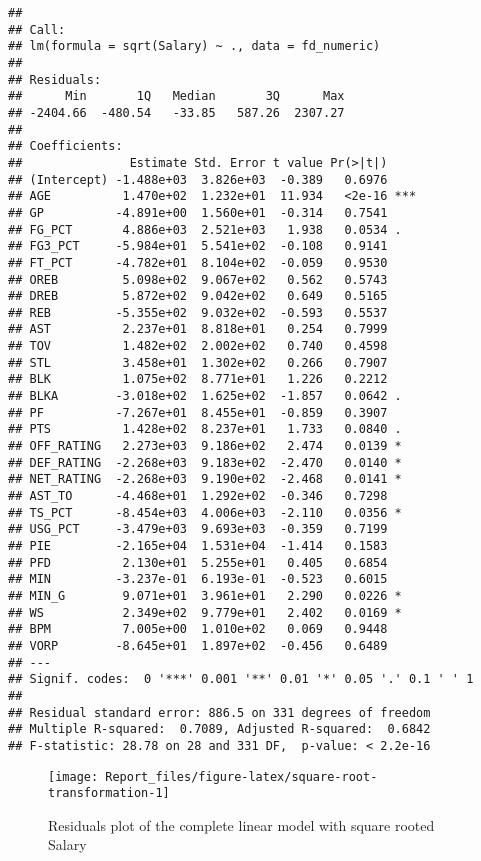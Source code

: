 \documentclass[
]{article}
\begin{document}
\begin{verbatim}
## 
## Call:
## lm(formula = sqrt(Salary) ~ ., data = fd_numeric)
## 
## Residuals:
##      Min       1Q   Median       3Q      Max 
## -2404.66  -480.54   -33.85   587.26  2307.27 
## 
## Coefficients:
##               Estimate Std. Error t value Pr(>|t|)    
## (Intercept) -1.488e+03  3.826e+03  -0.389   0.6976    
## AGE          1.470e+02  1.232e+01  11.934   <2e-16 ***
## GP          -4.891e+00  1.560e+01  -0.314   0.7541    
## FG_PCT       4.886e+03  2.521e+03   1.938   0.0534 .  
## FG3_PCT     -5.984e+01  5.541e+02  -0.108   0.9141    
## FT_PCT      -4.782e+01  8.104e+02  -0.059   0.9530    
## OREB         5.098e+02  9.067e+02   0.562   0.5743    
## DREB         5.872e+02  9.042e+02   0.649   0.5165    
## REB         -5.355e+02  9.032e+02  -0.593   0.5537    
## AST          2.237e+01  8.818e+01   0.254   0.7999    
## TOV          1.482e+02  2.002e+02   0.740   0.4598    
## STL          3.458e+01  1.302e+02   0.266   0.7907    
## BLK          1.075e+02  8.771e+01   1.226   0.2212    
## BLKA        -3.018e+02  1.625e+02  -1.857   0.0642 .  
## PF          -7.267e+01  8.455e+01  -0.859   0.3907    
## PTS          1.428e+02  8.237e+01   1.733   0.0840 .  
## OFF_RATING   2.273e+03  9.186e+02   2.474   0.0139 *  
## DEF_RATING  -2.268e+03  9.183e+02  -2.470   0.0140 *  
## NET_RATING  -2.268e+03  9.190e+02  -2.468   0.0141 *  
## AST_TO      -4.468e+01  1.292e+02  -0.346   0.7298    
## TS_PCT      -8.454e+03  4.006e+03  -2.110   0.0356 *  
## USG_PCT     -3.479e+03  9.693e+03  -0.359   0.7199    
## PIE         -2.165e+04  1.531e+04  -1.414   0.1583    
## PFD          2.130e+01  5.255e+01   0.405   0.6854    
## MIN         -3.237e-01  6.193e-01  -0.523   0.6015    
## MIN_G        9.071e+01  3.961e+01   2.290   0.0226 *  
## WS           2.349e+02  9.779e+01   2.402   0.0169 *  
## BPM          7.005e+00  1.010e+02   0.069   0.9448    
## VORP        -8.645e+01  1.897e+02  -0.456   0.6489    
## ---
## Signif. codes:  0 '***' 0.001 '**' 0.01 '*' 0.05 '.' 0.1 ' ' 1
## 
## Residual standard error: 886.5 on 331 degrees of freedom
## Multiple R-squared:  0.7089, Adjusted R-squared:  0.6842 
## F-statistic: 28.78 on 28 and 331 DF,  p-value: < 2.2e-16
\end{verbatim}

\begin{figure}

{\centering \texttt{[image: Report\_files/figure-latex/square-root-transformation-1]} 

}

\caption{Residuals plot of the complete linear model with square rooted Salary \label{fig:square-root-transformation}}\label{fig:square-root-transformation}
\end{figure}
\end{document}
